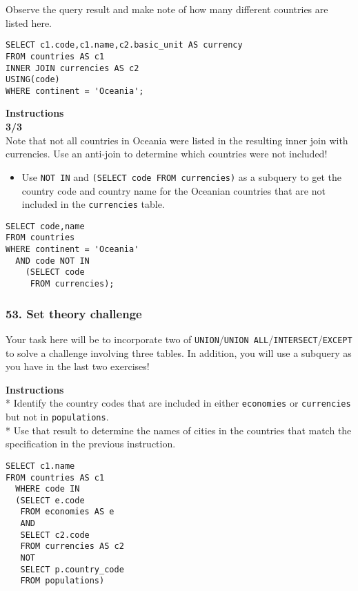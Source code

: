 \documentclass[
]{article}
\providecommand{\tightlist}{%
  \setlength{\itemsep}{0pt}\setlength{\parskip}{0pt}}
\begin{document}
Observe the query result and make note of how many different countries
are listed here.

\begin{verbatim}
SELECT c1.code,c1.name,c2.basic_unit AS currency
FROM countries AS c1
INNER JOIN currencies AS c2
USING(code)
WHERE continent = 'Oceania';
\end{verbatim}

\textbf{Instructions}\\
\textbf{3/3}\\
Note that not all countries in Oceania were listed in the resulting
inner join with currencies. Use an anti-join to determine which
countries were not included!

\begin{itemize}
\tightlist
\item
  Use \texttt{NOT\ IN} and \texttt{(SELECT\ code\ FROM\ currencies)} as
  a subquery to get the country code and country name for the Oceanian
  countries that are not included in the \texttt{currencies} table.
\end{itemize}

\begin{verbatim}
SELECT code,name
FROM countries 
WHERE continent = 'Oceania'
  AND code NOT IN
    (SELECT code 
     FROM currencies);
\end{verbatim}

\hypertarget{set-theory-challenge}{%
\subsubsection{53. Set theory challenge}\label{set-theory-challenge}}

Your task here will be to incorporate two of
\texttt{UNION}/\texttt{UNION\ ALL}/\texttt{INTERSECT}/\texttt{EXCEPT} to
solve a challenge involving three tables. In addition, you will use a
subquery as you have in the last two exercises!

\textbf{Instructions}\\
* Identify the country codes that are included in either
\texttt{economies} or \texttt{currencies} but not in
\texttt{populations}.\\
* Use that result to determine the names of cities in the countries that
match the specification in the previous instruction.

\begin{verbatim}
SELECT c1.name
FROM countries AS c1
  WHERE code IN
  (SELECT e.code
   FROM economies AS e
   AND
   SELECT c2.code
   FROM currencies AS c2
   NOT
   SELECT p.country_code
   FROM populations)
\end{verbatim}
\end{document}
